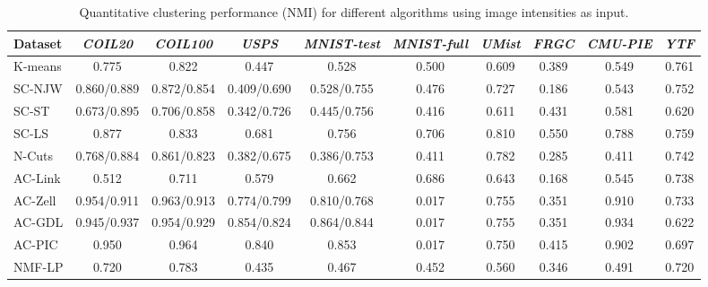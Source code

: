 \documentclass[10pt,twocolumn,letterpaper]{article}
\begin{document}
\begin{table*}[!ht]
\caption{{Quantitative clustering performance (NMI) for different algorithms using image intensities as input.}}
\vspace{-15pt}
\center
\small
\begin{tabular}{lccccccccc}
\toprule 
   Dataset & \textit{COIL20} & \textit{COIL100} & \textit{USPS} & \textit{MNIST-test} & \textit{MNIST-full} & \textit{UMist} & \textit{FRGC} & \textit{CMU-PIE} & \textit{YTF} \\   
     
     \midrule
  K-means \cite{macqueen1967some}  &0.775 &0.822 &0.447 &0.528 & 0.500
  &0.609 &0.389 &0.549 & 0.761 \\
  
  SC-NJW \cite{ng2002spectral}     &0.860/0.889 &0.872/0.854  &0.409/0.690  &0.528/0.755 & 0.476 & 0.727    & 0.186     & 0.543  &0.752      \\
      
  SC-ST \cite{zelnik2004self}      & 0.673/0.895 &0.706/0.858   & 0.342/0.726    & 0.445/0.756 & 0.416 & 0.611    & 0.431   &   0.581        &0.620  \\
  
  SC-LS \cite{chen2011large}    & 0.877       &0.833   & 0.681    & 0.756  & 0.706 & 0.810       &  0.550   & 0.788       &0.759 \\
  
  N-Cuts \cite{shi2000normalized}  & 0.768/0.884 &0.861/0.823  & 0.382/0.675   & 0.386/0.753 & 0.411 & 0.782 & 0.285   &  0.411     &0.742 \\
  
  AC-Link \cite{jain1999data}      & 0.512       &0.711  & 0.579    & 0.662  & 0.686 &0.643      &   0.168  & 0.545  &0.738 \\
    
  AC-Zell \cite{zhao2009cyclizing} & 0.954/0.911 &0.963/0.913  & 0.774/0.799    & 0.810/0.768  & 0.017 &0.755    & 0.351    &   0.910  &0.733  \\
  
  AC-GDL \cite{zhang2012graph}     & 0.945/0.937 &0.954/0.929   & 0.854/0.824   & 0.864/0.844  & 0.017  &0.755    & 0.351   &  0.934  &0.622  \\   
  
  AC-PIC \cite{zhang2013agglomerative}   & 0.950 &0.964   & 0.840    & 0.853 & 0.017 &0.750      &  0.415  & 0.902 & 0.697 \\
  
  NMF-LP \cite{cai2009locality}    & 0.720       &0.783   & 0.435    & 0.467  & 0.452 & 0.560    & 0.346      &0.491 & 0.720 \\
  

\end{tabular}
\end{table*}
\end{document}
